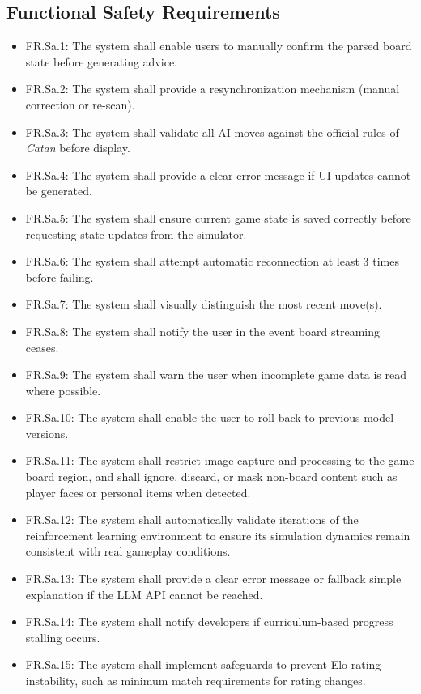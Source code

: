 \documentclass{article}
\begin{document}
\subsection*{Functional Safety Requirements}
\begin{itemize}
    \item FR.Sa.1: The system shall enable users to manually confirm the parsed board state before generating advice.
    \item FR.Sa.2: The system shall provide a resynchronization mechanism (manual correction or re-scan).
    \item FR.Sa.3: The system shall validate all AI moves against the official rules of \emph{Catan} before display.
    \item FR.Sa.4: The system shall provide a clear error message if UI updates cannot be generated.
    \item FR.Sa.5: The system shall ensure current game state is saved correctly before requesting state updates from the simulator.
    \item FR.Sa.6: The system shall attempt automatic reconnection at least 3 times before failing.
    \item FR.Sa.7: The system shall visually distinguish the most recent move(s).
    \item FR.Sa.8: The system shall notify the user in the event board streaming ceases.
    \item FR.Sa.9: The system shall warn the user when incomplete game data is read where possible.
    \item FR.Sa.10: The system shall enable the user to roll back to previous model versions.
    \item FR.Sa.11: The system shall restrict image capture and processing to the game board region, and shall ignore, discard, or mask non-board content such as player faces or personal items when detected.
    \item FR.Sa.12: The system shall automatically validate iterations of the reinforcement learning environment to ensure its simulation dynamics remain consistent with real gameplay conditions.
    \item FR.Sa.13: The system shall provide a clear error message or fallback simple explanation if the LLM API cannot be reached.
    \item FR.Sa.14: The system shall notify developers if curriculum-based progress stalling occurs.
    \item FR.Sa.15: The system shall implement safeguards to prevent Elo rating instability, such as minimum match requirements for rating changes. \newline
\end{itemize}
\end{document}
